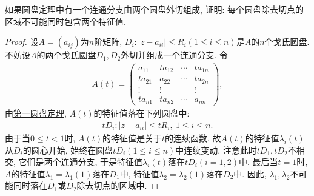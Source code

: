\documentclass[../../main.tex]{subfiles}%
\begin{document}
\begin{example}
如果圆盘定理中有一个连通分支由两个圆盘外切组成, 证明: 每个圆盘除去切点的区域不可能同时包含两个特征值.
\end{example}
\begin{proof}

设\(A = (a_{ij})\)为\(n\)阶矩阵, \(D_{i}:|z - a_{ii}| \leqslant  R_{i}(1 \leqslant  i \leqslant  n)\)是\(A\)的\(n\)个戈氏圆盘. 不妨设\(A\)的两个戈氏圆盘\(D_{1},D_{2}\)外切并组成一个连通分支. 令
\begin{align*}
A(t)= 
\begin{pmatrix}
a_{11} & ta_{12} & \cdots & ta_{1n}\\
ta_{21} & a_{22} & \cdots & ta_{2n}\\
\vdots & \vdots & & \vdots\\
ta_{n1} & ta_{n2} & \cdots & a_{nn}
\end{pmatrix},
\end{align*}
由\hyperref[theorem:第一圆盘定理]{第一圆盘定理}, \(A(t)\)的特征值落在下列圆盘中:
\begin{align*}
tD_{i}:|z - a_{ii}| \leqslant  tR_{i},\ 1 \leqslant  i \leqslant  n.
\end{align*}
由于当\(0 \leqslant  t < 1\)时, \(A(t)\)的特征值是关于\(t\)的连续函数, 故\(A(t)\)的特征值\(\lambda_{i}(t)\)从\(D_{i}\)的圆心开始, 始终在圆盘\(tD_{i}(1 \leqslant  i \leqslant  n)\)中连续变动. 注意此时\(tD_{1},tD_{2}\)不相交, 它们是两个连通分支, 于是特征值\(\lambda_{i}(t)\)落在\(tD_{i}(i = 1,2)\)中. 最后当\(t = 1\)时, \(A\)的特征值\(\lambda_{1}=\lambda_{1}(1)\)落在\(D_{1}\)中, 特征值\(\lambda_{2}=\lambda_{2}(1)\)落在\(D_{2}\)中. 因此, \(\lambda_{1},\lambda_{2}\)不可能同时落在\(D_{1}\)或\(D_{2}\)除去切点的区域中.

\end{proof}
\end{document}
